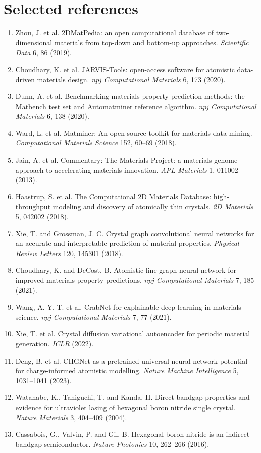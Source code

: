 \documentclass[10pt]{article}
\begin{document}
\section*{Selected references}
\small
\begin{enumerate}[leftmargin=1.2em,itemsep=1pt]
  \item Zhou, J. et al. 2DMatPedia: an open computational database of two-dimensional materials from top-down and bottom-up approaches. \textit{Scientific Data} 6, 86 (2019).
  \item Choudhary, K. et al. JARVIS-Tools: open-access software for atomistic data-driven materials design. \textit{npj Computational Materials} 6, 173 (2020).
  \item Dunn, A. et al. Benchmarking materials property prediction methods: the Matbench test set and Automatminer reference algorithm. \textit{npj Computational Materials} 6, 138 (2020).
  \item Ward, L. et al. Matminer: An open source toolkit for materials data mining. \textit{Computational Materials Science} 152, 60--69 (2018).
  \item Jain, A. et al. Commentary: The Materials Project: a materials genome approach to accelerating materials innovation. \textit{APL Materials} 1, 011002 (2013).
  \item Haastrup, S. et al. The Computational 2D Materials Database: high-throughput modeling and discovery of atomically thin crystals. \textit{2D Materials} 5, 042002 (2018).
  \item Xie, T. and Grossman, J. C. Crystal graph convolutional neural networks for an accurate and interpretable prediction of material properties. \textit{Physical Review Letters} 120, 145301 (2018).
  \item Choudhary, K. and DeCost, B. Atomistic line graph neural network for improved materials property predictions. \textit{npj Computational Materials} 7, 185 (2021).
  \item Wang, A. Y.-T. et al. CrabNet for explainable deep learning in materials science. \textit{npj Computational Materials} 7, 77 (2021).
  \item Xie, T. et al. Crystal diffusion variational autoencoder for periodic material generation. \textit{ICLR} (2022).
  \item Deng, B. et al. CHGNet as a pretrained universal neural network potential for charge-informed atomistic modelling. \textit{Nature Machine Intelligence} 5, 1031--1041 (2023).
  \item Watanabe, K., Taniguchi, T. and Kanda, H. Direct-bandgap properties and evidence for ultraviolet lasing of hexagonal boron nitride single crystal. \textit{Nature Materials} 3, 404--409 (2004).
  \item Cassabois, G., Valvin, P. and Gil, B. Hexagonal boron nitride is an indirect bandgap semiconductor. \textit{Nature Photonics} 10, 262--266 (2016).
\end{enumerate}
\normalsize
\end{document}
